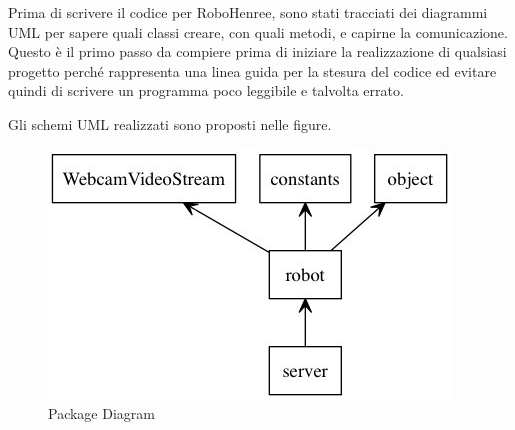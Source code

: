 \documentclass[a4paper,12pt,italian]{article}
\begin{document}
Prima di scrivere il codice per RoboHenree, sono stati tracciati dei diagrammi UML per sapere quali classi creare, con quali metodi, e capirne la comunicazione. Questo è il primo passo da compiere prima di iniziare la realizzazione di qualsiasi progetto perché rappresenta una linea guida per la stesura del codice ed evitare quindi di scrivere un programma poco leggibile e talvolta errato. 

Gli schemi UML realizzati sono proposti nelle figure.

\begin{figure}[H]
\begin{center}
\includegraphics[scale=0.8]{package_diagram}
\caption{Package Diagram}
\label{Fig: package}
\end{center}
\end{figure}
\end{document}
